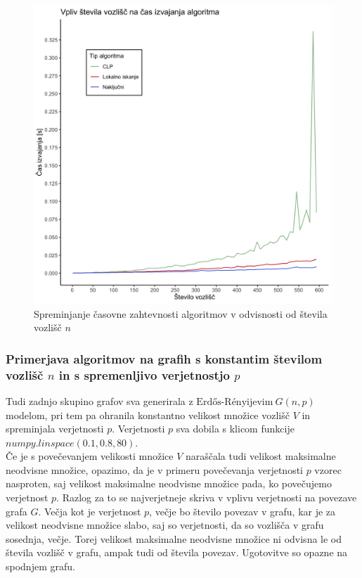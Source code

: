 \documentclass[a4paper, 12pt]{article}
\begin{document}
\begin{figure}[h!]
	\begin{center}
		\includegraphics[scale=0.12]{R_koda/voz-cas.png}
		\caption{Spreminjanje časovne zahtevnosti algoritmov v odvisnosti od števila vozlišč $n$}
	\end{center}
\end{figure}

\newpage
\subsubsection{Primerjava algoritmov na grafih s konstantim številom vozlišč $n$ in s spremenljivo verjetnostjo $p$}

Tudi zadnjo skupino grafov sva generirala z $\text{Erdős-Rényijevim}\ G(n, p)$ modelom, pri tem pa ohranila konstantno velikost množice vozlišč $V$ in spreminjala verjetnosti $p$.
Verjetnosti $p$ sva dobila s klicom funkcije $numpy.linspace(0.1, 0.8, 80)$.\\

\noindent Če je s povečevanjem velikosti množice $V$ naraščala tudi velikost maksimalne neodvisne množice, opazimo, da je v primeru povečevanja verjetnosti $p$ vzorec nasproten, saj
velikost maksimalne neodvisne množice pada, ko povečujemo verjetnost $p$. Razlog za to se najverjetneje skriva v vplivu verjetnosti na povezave grafa $G$. 
Večja kot je verjetnost $p$, večje bo število povezav v grafu, kar je za velikost neodvisne množice slabo, saj so verjetnosti, da so vozlišča v grafu sosednja, večje. 
Torej velikost maksimalne neodvisne množice ni odvisna le od števila vozlišč v grafu, ampak tudi od števila povezav. Ugotovitve so opazne na spodnjem grafu.\\
\end{document}
